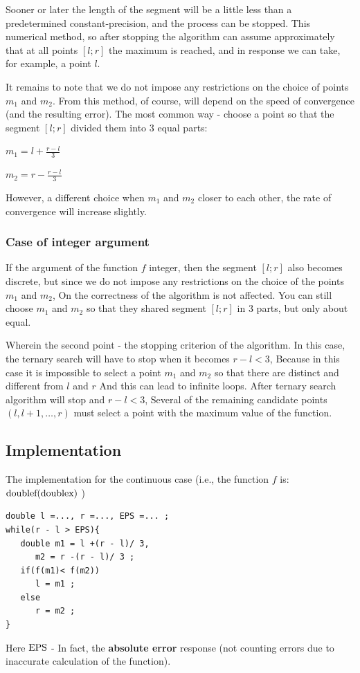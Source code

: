 Sooner or later the length of the segment will be a little less than a predetermined constant-precision, and the process can be stopped. This numerical method, so after stopping the algorithm can assume approximately that at all points $[l; r]$ the maximum is reached, and in response we can take, for example, a point $l$.

It remains to note that we do not impose any restrictions on the choice of points $m_1$ and $m_2$. From this method, of course, will depend on the speed of convergence (and the resulting error). The most common way - choose a point so that the segment $[l; r]$ divided them into 3 equal parts:

$m_1 = l + \frac {r-l} {3}$

$m_2 = r - \frac {r-l} {3}$

However, a different choice when $m_1$ and $m_2$ closer to each other, the rate of convergence will increase slightly.

\subsubsection{ Case of integer argument }

If the argument of the function $f$ integer, then the segment $[l; r]$ also becomes discrete, but since we do not impose any restrictions on the choice of the points $m_1$ and $m_2$, On the correctness of the algorithm is not affected. You can still choose $m_1$ and $m_2$ so that they shared segment $[l; r]$ in 3 parts, but only about equal.

Wherein the second point - the stopping criterion of the algorithm. In this case, the ternary search will have to stop when it becomes $r-l <3$, Because in this case it is impossible to select a point $m_1$ and $m_2$ so that there are distinct and different from $l$ and $r$ And this can lead to infinite loops. After ternary search algorithm will stop and $r-l <3$, Several of the remaining candidate points $(l, l +1, \ldots, r)$ must select a point with the maximum value of the function.

\subsection{ Implementation }

The implementation for the continuous case (i.e., the function $f$ is: $\rm double f (\rm double x)$ )

\begin{verbatim}
double l =..., r =..., EPS =... ;
while(r - l > EPS){
   double m1 = l +(r - l)/ 3,
      m2 = r -(r - l)/ 3 ;
   if(f(m1)< f(m2))
      l = m1 ;
   else
      r = m2 ;
} 
\end{verbatim}
Here $\rm EPS$ - In fact, the \textbf{absolute error} response (not counting errors due to inaccurate calculation of the function).

